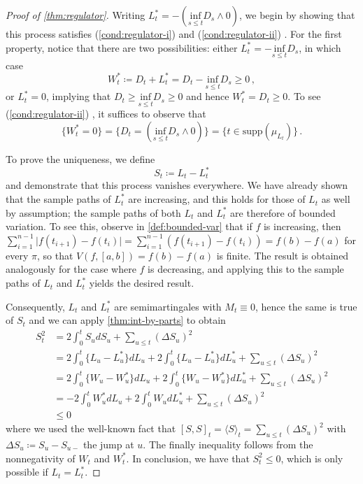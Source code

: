 \documentclass[titlepage]{article}
\makeatletter
\theoremstyle{plain}
\theoremstyle{definition}
\newcommand{\itemref}[1]{%
  \begingroup %
  (\let\perh@ps\@gobble\ref{#1})%
  \endgroup
}
\makeatother
\begin{document}
\begin{proof}[Proof of \cref{thm:regulator}]
  Writing $L^*_t  = -(\underset{s \leq t}{\mathrm{inf}} D_s \wedge 0)$, we begin by showing that this process satisfies \itemref{cond:regulator-i} and \itemref{cond:regulator-ii}. For the first property, notice that there are two possibilities: either $L^*_t = -\underset{s \leq t}{\mathrm{inf}} D_s$, in which case
  \begin{equation}
    W^*_t \coloneqq D_t + L^*_t = D_t - \underset{s \leq t}{\mathrm{inf}} D_s \geq 0 \,,
  \end{equation}
  or $L^*_t = 0$, implying that $D_t \geq \underset{s \leq t}{\mathrm{inf}} D_s \geq 0$ and hence $W^*_t = D_t \geq 0$. To see \itemref{cond:regulator-ii}, it suffices to observe that
  \begin{equation}
    \{ W^*_t = 0 \} = \{ D_t = (\underset{s \leq t}{\mathrm{inf}} D_s \wedge 0) \} = \{ t \in \mathrm{supp}(\mu_{L_t}) \} \,.
  \end{equation}

  To prove the uniqueness, we define
  \begin{equation}
    S_t \coloneqq L_t - L^*_t
  \end{equation}
  and demonstrate that this process vanishes everywhere. We have already shown that the sample paths of $L^*_t$ are increasing, and this holds for those of $L_t$ as well by assumption; the sample paths of both $L_t$ and $L^*_t$ are therefore of bounded variation. To see this, observe in \cref{def:bounded-var} that if $f$ is increasing, then $\sum_{i = 1}^{n - 1} \vert f(t_{i + 1}) - f(t_i) \vert = \sum_{i = 1}^{n - 1} (f(t_{i + 1}) - f(t_i)) = f(b) - f(a)$ for every $\pi$, so that $V(f, [a, b]) = f(b) - f(a)$ is finite. The result is obtained analogously for the case where $f$ is decreasing, and applying this to the sample paths of $L_t$ and $L^*_t$ yields the desired result.

  Consequently, $L_t$ and $L^*_t$ are semimartingales with $M_t \equiv 0$, hence the same is true of $S_t$ and we can apply \cref{thm:int-by-parts} to obtain
  \begin{align}
    S_t^2 & = 2 \int_0^t S_u dS_u + \sum_{u \leq t} (\Delta S_u)^2                                                    \\
          & =2 \int_0^t \{ L_u - L^*_u \} dL_u + 2 \int_0^t \{ L_u - L^*_u \} dL^*_u + \sum_{u \leq t} (\Delta S_u)^2 \\
          & =2 \int_0^t \{ W_u - W^*_u \} dL_u + 2 \int_0^t \{ W_u - W^*_u \} dL^*_u + \sum_{u \leq t} (\Delta S_u)^2 \\
          & =-2 \int_0^t W^*_u dL_u + 2 \int_0^t W_u dL^*_u + \sum_{u \leq t} (\Delta S_u)^2                          \\
          & \leq 0 \,
  \end{align}
  where we used the well-known fact that $[S, S]_t = \langle S \rangle_t = \sum_{u \leq t} (\Delta S_u)^2$ with $\Delta S_u \coloneqq S_u - S_{u-}$ the jump at $u$. The finally inequality follows from the nonnegativity of $W_t$ and $W^*_t$. In conclusion, we have that $S_t^2 \leq 0$, which is only possible if $L_t = L^*_t$.
\end{proof}
\end{document}

